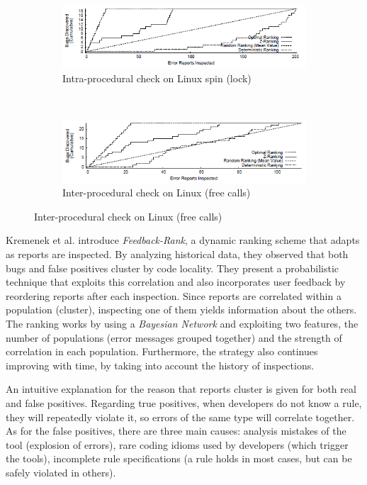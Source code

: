 \begin{figure}[H]
     \begin{subfigure}{1\textwidth}
         \centering
         \includegraphics[scale=0.7]{./src/z_ranking_result_linux_intra.png}
         \caption{Intra-procedural check on Linux spin (lock)}
     \end{subfigure}\\
     \begin{subfigure}{1\textwidth}
         \centering
         \includegraphics[scale=0.7]{./src/z_ranking_result_linux_inter.png}
         \caption{Inter-procedural check on Linux (free calls)}
     \end{subfigure}
 \end{figure}


 \label{lit:fbrank}
 Kremenek et al. \cite{correlation_exploitation} introduce \textit{Feedback-Rank}, a dynamic ranking scheme that adapts as reports are inspected. By analyzing historical data, they observed that both bugs and false positives cluster by code locality. They present a probabilistic technique that exploits this correlation and also incorporates user feedback by reordering reports after each inspection. Since reports are correlated within a population (cluster), inspecting one of them yields information about the others. The ranking works by using a \textit{Bayesian Network} and exploiting two features, the number of populations (error messages grouped together) and the strength of correlation in each population. Furthermore, the strategy also continues improving with time, by taking into account the history of inspections.

 An intuitive explanation for the reason that reports cluster is given for both real and false positives. Regarding true positives, when developers do not know a rule, they will repeatedly violate it, so errors of the same type will correlate together. As for the false positives, there are three main causes: analysis mistakes of the tool (explosion of errors), rare coding idioms used by developers (which trigger the tools), incomplete rule specifications (a rule holds in most cases, but can be safely violated in others).

